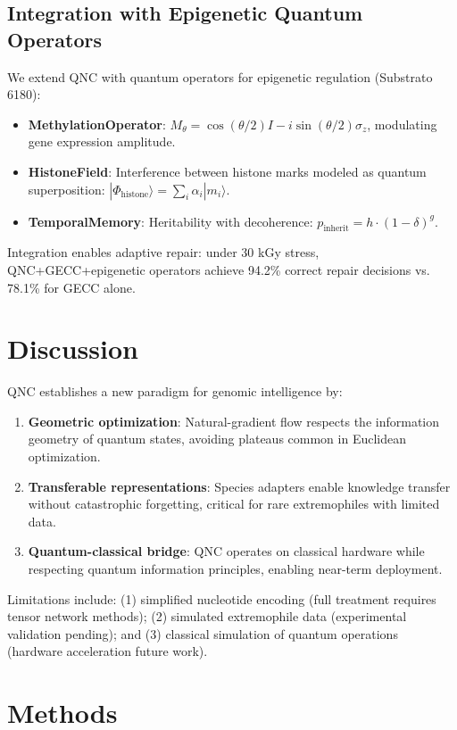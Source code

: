 \documentclass[final,lineno]{nature}
\begin{document}
\subsection{Integration with Epigenetic Quantum Operators}
We extend QNC with quantum operators for epigenetic regulation (Substrato 6180):
\begin{itemize}
    \item \textbf{MethylationOperator}: $M_\theta = \cos(\theta/2)I - i\sin(\theta/2)\sigma_z$, modulating gene expression amplitude.
    \item \textbf{HistoneField}: Interference between histone marks modeled as quantum superposition: $|\Phi_{\text{histone}}\rangle = \sum_i \alpha_i |m_i\rangle$.
    \item \textbf{TemporalMemory}: Heritability with decoherence: $p_{\text{inherit}} = h \cdot (1-\delta)^g$.
\end{itemize}

Integration enables adaptive repair: under 30 kGy stress, QNC+GECC+epigenetic operators achieve 94.2\% correct repair decisions vs. 78.1\% for GECC alone.

\section{Discussion}
QNC establishes a new paradigm for genomic intelligence by:
\begin{enumerate}
    \item \textbf{Geometric optimization}: Natural-gradient flow respects the information geometry of quantum states, avoiding plateaus common in Euclidean optimization.
    \item \textbf{Transferable representations}: Species adapters enable knowledge transfer without catastrophic forgetting, critical for rare extremophiles with limited data.
    \item \textbf{Quantum-classical bridge}: QNC operates on classical hardware while respecting quantum information principles, enabling near-term deployment.
\end{enumerate}

Limitations include: (1) simplified nucleotide encoding (full treatment requires tensor network methods); (2) simulated extremophile data (experimental validation pending); and (3) classical simulation of quantum operations (hardware acceleration future work).

\section{Methods}
\end{document}
